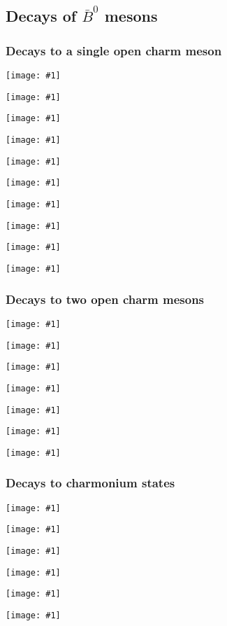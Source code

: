 \clearpage

% 

\newcommand{\btocharmplot}[1]{\begin{center}\texttt{[image: \#1]}\end{center}}
\newenvironment{btocharmtab}[1]{\begin{table}[H]\begin{center}\caption{#1}\begin{tabular}{| l l l |}}{\end{tabular}\end{center}\end{table}}
\newcommand{\btocharm}[1]{\btocharmplot{b2charm/#1}}
\renewcommand{\tablename}{Table+Figure}




\subsection{Decays of $\bar{B}^0$ mesons}

\subsubsection{Decays to a single open charm meson}
\btocharm{Bd_D_1}
\btocharm{Bd_D_2}
\btocharm{Bd_D_3}
\btocharm{Bd_D_4}
\btocharm{Bd_D_5}
\btocharm{Bd_D_6}
\btocharm{Bd_D_7}
\btocharm{Bd_D_8}
\btocharm{Bd_D_9}
\btocharm{Bd_D_10}

\subsubsection{Decays to two open charm mesons}
\btocharm{Bd_DD_1}
\btocharm{Bd_DD_2}
\btocharm{Bd_DD_3}
\btocharm{Bd_DD_4}
\btocharm{Bd_DD_5}
\btocharm{Bd_DD_6}
\btocharm{Bd_DD_7}

\subsubsection{Decays to charmonium states}
\btocharm{Bd_cc_1}
\btocharm{Bd_cc_2}
\btocharm{Bd_cc_3}
\btocharm{Bd_cc_4}
\btocharm{Bd_cc_5}
\btocharm{Bd_cc_6}

